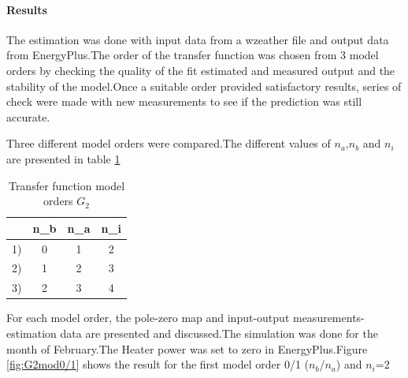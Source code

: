 \documentclass[a4paper,12pt]{article}
\numberwithin{equation}{section}
\begin{document}
\paragraph{Results}
The estimation was done with input data from a wzeather file and output data from EnergyPlus.The order of the transfer function was chosen from 3 model orders by checking the quality of the fit estimated and measured output and the stability of the model.Once a suitable order provided satisfactory results, series of check were made with new measurements to see if the prediction was still accurate.

\noindent
Three different model orders were compared.The different values of  $n_{a}$,$n_{b}$ and $n_{i}$ are  presented in table \ref{table:model order G_{2}}

\begin{table}[H]
\centering
\begin{tabular}{|c|c|c|c|}
\hline  & n_{b} & n_{a} & n_{i} \\
\hline 1) & 0 & 1 & 2 \\
\hline 2) & 1 & 2 & 3\\
\hline 3) & 2 & 3 & 4\\
\hline
\end{tabular}
\caption{Transfer function model orders $G_{2}$}
\label{table:model order G_{2}}
\end{table}

\noindent
For each model order, the pole-zero map and input-output measurements-estimation data  are presented and discussed.The simulation was done for the month of February.The Heater power was set to zero in EnergyPlus.Figure \ref{fig:G2mod0/1} shows the result for the first model order 0/1 ($n_{b}$/$n_{a}$) and $n_{i}$=2
\end{document}
